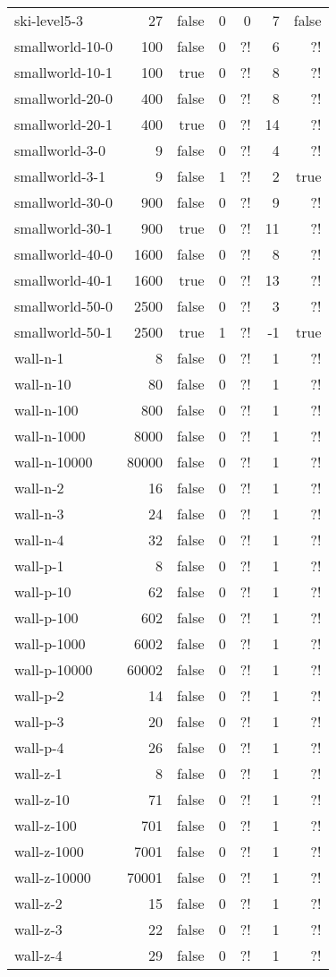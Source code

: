\begin{longtable}{lrrrrrr}
	ski-level5-3 & 27 & false & 0 & 0 & 7 & false\\
	smallworld-10-0 & 100 & false & 0 & ?! & 6 & ?!\\
	smallworld-10-1 & 100 & true & 0 & ?! & 8 & ?!\\
	smallworld-20-0 & 400 & false & 0 & ?! & 8 & ?!\\
	smallworld-20-1 & 400 & true & 0 & ?! & 14 & ?!\\
	smallworld-3-0 & 9 & false & 0 & ?! & 4 & ?!\\
	smallworld-3-1 & 9 & false & 1 & ?! & 2 & true\\
	smallworld-30-0 & 900 & false & 0 & ?! & 9 & ?!\\
	smallworld-30-1 & 900 & true & 0 & ?! & 11 & ?!\\
	smallworld-40-0 & 1600 & false & 0 & ?! & 8 & ?!\\
	smallworld-40-1 & 1600 & true & 0 & ?! & 13 & ?!\\
	smallworld-50-0 & 2500 & false & 0 & ?! & 3 & ?!\\
	smallworld-50-1 & 2500 & true & 1 & ?! & -1 & true\\
	wall-n-1 & 8 & false & 0 & ?! & 1 & ?!\\
	wall-n-10 & 80 & false & 0 & ?! & 1 & ?!\\
	wall-n-100 & 800 & false & 0 & ?! & 1 & ?!\\
	wall-n-1000 & 8000 & false & 0 & ?! & 1 & ?!\\
	wall-n-10000 & 80000 & false & 0 & ?! & 1 & ?!\\
	wall-n-2 & 16 & false & 0 & ?! & 1 & ?!\\
	wall-n-3 & 24 & false & 0 & ?! & 1 & ?!\\
	wall-n-4 & 32 & false & 0 & ?! & 1 & ?!\\
	wall-p-1 & 8 & false & 0 & ?! & 1 & ?!\\
	wall-p-10 & 62 & false & 0 & ?! & 1 & ?!\\
	wall-p-100 & 602 & false & 0 & ?! & 1 & ?!\\
	wall-p-1000 & 6002 & false & 0 & ?! & 1 & ?!\\
	wall-p-10000 & 60002 & false & 0 & ?! & 1 & ?!\\
	wall-p-2 & 14 & false & 0 & ?! & 1 & ?!\\
	wall-p-3 & 20 & false & 0 & ?! & 1 & ?!\\
	wall-p-4 & 26 & false & 0 & ?! & 1 & ?!\\
	wall-z-1 & 8 & false & 0 & ?! & 1 & ?!\\
	wall-z-10 & 71 & false & 0 & ?! & 1 & ?!\\
	wall-z-100 & 701 & false & 0 & ?! & 1 & ?!\\
	wall-z-1000 & 7001 & false & 0 & ?! & 1 & ?!\\
	wall-z-10000 & 70001 & false & 0 & ?! & 1 & ?!\\
	wall-z-2 & 15 & false & 0 & ?! & 1 & ?!\\
	wall-z-3 & 22 & false & 0 & ?! & 1 & ?!\\
	wall-z-4 & 29 & false & 0 & ?! & 1 & ?!\\

	\bottomrule
\end{longtable}
\medskip
